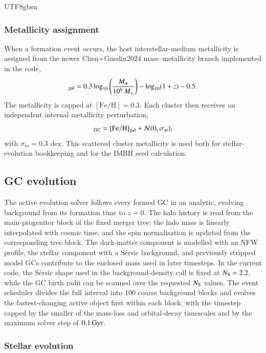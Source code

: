 \documentclass[trackchanges, twocolappendix, twocolumn]{aastex701}
\begin{document}
\begin{CJK*}{UTF8}{gbsn}
\subsubsection{Metallicity assignment} \label{subsubsect:metallicity_assignment}

When a formation event occurs, the host interstellar-medium metallicity is assigned from the newer Chen+Gnedin2024 mass--metallicity branch implemented in the code,
\begin{equation}
[\mathrm{Fe}/\mathrm{H}]_{\rm gal}
=0.3\log_{10}\left(\frac{M_{\star}}{10^9\,M_{\odot}}\right)
-\log_{10}(1+z)-0.5 .
\label{eq:chen_mzr}
\end{equation}
The metallicity is capped at \([\mathrm{Fe}/\mathrm{H}]=0.3\). Each cluster then receives an independent internal metallicity perturbation,
\begin{equation}
[\mathrm{Fe}/\mathrm{H}]_{\rm GC}
=[\mathrm{Fe}/\mathrm{H}]_{\rm gal}+\mathcal{N}(0,\sigma_m),
\end{equation}
with \(\sigma_m=0.3\) dex. This scattered cluster metallicity is used both for stellar-evolution bookkeeping and for the IMBH seed calculation.

\subsection{GC evolution} \label{subsect:gc_evolution}

The active evolution solver follows every formed GC in an analytic, evolving background from its formation time to \(z=0\). The halo history is read from the main-progenitor block of the fixed merger tree; the halo mass is linearly interpolated with cosmic time, and the spin normalisation is updated from the corresponding tree block. The dark-matter component is modelled with an NFW profile, the stellar component with a S{\'e}rsic background, and previously stripped model GCs contribute to the enclosed mass used in later timesteps. In the current code, the S{\'e}rsic shape used in the background-density call is fixed at \(N_{\rm S}=2.2\), while the GC birth radii can be scanned over the requested \(N_{\rm S}\) values. The event scheduler divides the full interval into 100 coarse background blocks and evolves the fastest-changing active object first within each block, with the timestep capped by the smaller of the mass-loss and orbital-decay timescales and by the maximum solver step of \(0.1\,{\rm Gyr}\).

\subsubsection{Stellar evolution} \label{subsubsect:stellar_evolution}


\end{CJK*}
\end{document}
